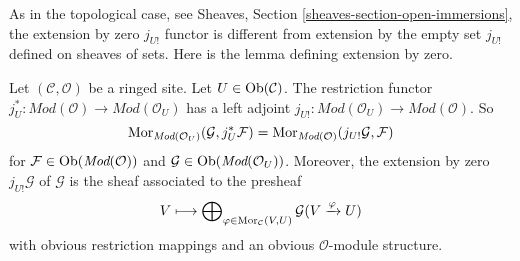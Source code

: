 \noindent
As in the topological case, see
Sheaves, Section \ref{sheaves-section-open-immersions},
the extension by zero $j_{U!}$ functor is different from
extension by the empty set $j_{U!}$ defined on sheaves of sets.
Here is the lemma defining extension by zero.

\begin{lemma}
\label{lemma-extension-by-zero}
Let $(\mathcal{C}, \mathcal{O})$ be a ringed site.
Let $U \in \mathop{\rm Ob}\nolimits(\mathcal{C})$.
The restriction functor
$j_U^* : \textit{Mod}(\mathcal{O}) \to \textit{Mod}(\mathcal{O}_U)$
has a left adjoint
$j_{U!} : \textit{Mod}(\mathcal{O}_U) \to \textit{Mod}(\mathcal{O})$.
So
$$
\mathop{\rm Mor}\nolimits_{\textit{Mod}(\mathcal{O}_U)}(\mathcal{G}, j_U^*\mathcal{F})
=
\mathop{\rm Mor}\nolimits_{\textit{Mod}(\mathcal{O})}(j_{U!}\mathcal{G}, \mathcal{F})
$$
for $\mathcal{F} \in \mathop{\rm Ob}\nolimits(\textit{Mod}(\mathcal{O}))$
and $\mathcal{G} \in \mathop{\rm Ob}\nolimits(\textit{Mod}(\mathcal{O}_U))$.
Moreover, the extension by zero $j_{U!}\mathcal{G}$ of $\mathcal{G}$
is the sheaf associated to the presheaf
$$
V
\longmapsto
\bigoplus\nolimits_{\varphi \in \mathop{\rm Mor}\nolimits_\mathcal{C}(V, U)}
\mathcal{G}(V \xrightarrow{\varphi} U)
$$
with obvious restriction mappings and an obvious $\mathcal{O}$-module
structure.
\end{lemma}

